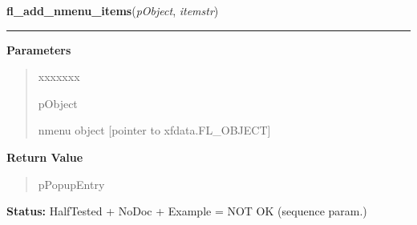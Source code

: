 \hspace{.8\funcindent}\begin{boxedminipage}{\funcwidth}

    \raggedright \textbf{fl\_add\_nmenu\_items}(\textit{pObject}, \textit{itemstr})

    \vspace{-1.5ex}

    \rule{\textwidth}{0.5\fboxrule}
\setlength{\parskip}{2ex}
\setlength{\parskip}{1ex}
      \textbf{Parameters}
      \vspace{-1ex}

      \begin{quote}
        \begin{Ventry}{xxxxxxx}

          \item[pObject]

          nmenu object [pointer to xfdata.FL\_OBJECT]

        \end{Ventry}

      \end{quote}

      \textbf{Return Value}
    \vspace{-1ex}

      \begin{quote}
      pPopupEntry

      \end{quote}

\textbf{Status:} HalfTested + NoDoc + Example = NOT OK (sequence param.)



    \end{boxedminipage}

    \label{xformslib:library:fl_insert_nmenu_items}

    \vspace{0.5ex}

